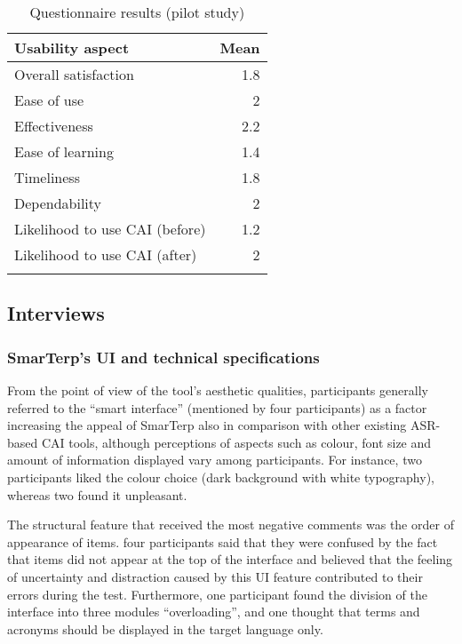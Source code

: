 \begin{table}
\begin{tabular}{lr}
\lsptoprule
Usability aspect      & Mean \\\midrule
Overall satisfaction           & 1.8           \\
Ease of use                    & 2             \\
Effectiveness                  & 2.2           \\
Ease of learning               & 1.4           \\
Timeliness                     & 1.8           \\
Dependability                  & 2             \\ \midrule
Likelihood to use CAI (before) & 1.2           \\
Likelihood to use CAI (after)  & 2             \\ \lspbottomrule
\end{tabular}
\caption{Questionnaire results (pilot study)\label{tab:17}}
\end{table}




\subsection{Interviews}

\subsubsection{SmarTerp’s UI and technical specifications}


From the point of view of the tool’s aesthetic qualities, participants generally referred to the ``smart interface'' (mentioned by four participants) as a factor increasing the appeal of SmarTerp also in comparison with other existing ASR-based CAI tools, although perceptions of aspects such as colour, font size and amount of information displayed vary among participants. For instance, two participants liked the colour choice (dark background with white typography), whereas two found it unpleasant.

The structural feature that received the most negative comments was the order of appearance of items. four participants said that they were confused by the fact that items did not appear at the top of the interface and believed that the feeling of uncertainty and distraction caused by this UI feature contributed to their errors during the test. Furthermore, one participant found the division of the interface into three modules “overloading”, and one thought that terms and acronyms should be displayed in the target language only.

